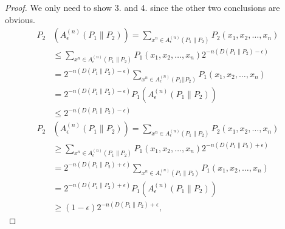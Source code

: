 \documentclass{article}
\begin{document}
\begin{proof}
        We only need to show 3. and 4. since the other two conclusions are obvious.
\begin{align*}
  P_{2}&\left(A_{\epsilon}^{(n)}\left(P_{1} \| P_{2}\right)\right)=\sum_{x^{n} \in A_{\epsilon}^{(n)}\left(P_{1} \| P_{2}\right)} P_{2}\left(x_{1}, x_{2}, \ldots, x_{n}\right) \\
&\leq \sum_{x^{n} \in A_{\epsilon}^{(n)}\left(P_{1} \| P_{2}\right)} P_{1}\left(x_{1}, x_{2}, \ldots, x_{n}\right) 2^{-n\left(D\left(P_{1} \| P_{2}\right)-\epsilon\right)} \\
&=2^{-n\left(D\left(P_{1} \| P_{2}\right)-\epsilon\right)} \sum_{x^{n} \in A_{\epsilon}^{(n)}\left(P_{1}|| P_{2}\right)} P_{1}\left(x_{1}, x_{2}, \ldots, x_{n}\right) \\
&=2^{-n\left(D\left(P_{1} \| P_{2}\right)-\epsilon\right)} P_{1}\left(A_{\epsilon}^{(n)}\left(P_{1} \| P_{2}\right)\right) \\
&\leq 2^{-n\left(D\left(P_{1} \| P_{2}\right)-\epsilon\right)}  
\end{align*}
\begin{align*}
P_{2}&\left(A_{\epsilon}^{(n)}\left(P_{1} \| P_{2}\right)\right)=\sum_{x^{n} \in A_{\epsilon}^{(n)}\left(P_{1} \| P_{2}\right)} P_{2}\left(x_{1}, x_{2}, \ldots, x_{n}\right) \\
&\geq \sum_{x^{n} \in A_{\epsilon}^{(n)}\left(P_{1} \| P_{2}\right)} P_{1}\left(x_{1}, x_{2}, \ldots, x_{n}\right) 2^{-n\left(D\left(P_{1} \| P_{2}\right)+\epsilon\right)} \\
&=2^{-n\left(D\left(P_{1} \| P_{2}\right)+\epsilon\right)} \sum_{x^{n} \in A_{\epsilon}^{(n)}\left(P_{1} \| P_{2}\right)} P_{1}\left(x_{1}, x_{2}, \ldots, x_{n}\right) \\
&=2^{-n\left(D\left(P_{1} \| P_{2}\right)+\epsilon\right)} P_{1}\left(A_{\epsilon}^{(n)}\left(P_{1} \| P_{2}\right)\right) \\
&\geq(1-\epsilon) 2^{-n\left(D\left(P_{1} \| P_{2}\right)+\epsilon\right.},
\end{align*}
\end{proof}
\end{document}
